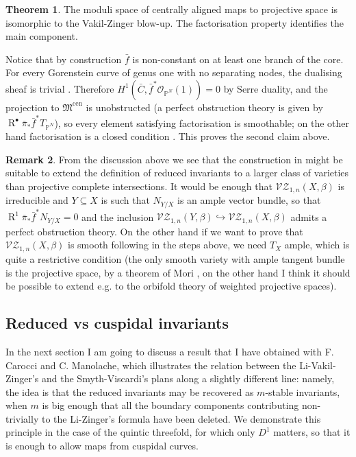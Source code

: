 \documentclass[11pt]{amsart}
\newcommand{\VZ}[3]{\mathcal{V\!Z}_{1,#1}(#2,#3)}
\newcommand{\PP}{\mathbb P}
\newcommand{\OO}{\mathcal{O}}
\newcommand{\MM}{\mathfrak M}
\newcommand{\R}{\operatorname{R}^{\bullet}}
\theoremstyle{definition}
\newtheorem{thm}{Theorem}[section]
\theoremstyle{definition}
\newtheorem{rmk}[thm]{Remark}
\begin{document}
\begin{thm}\cite[Theorems 4.6.3.2 and 4.5.1]{RSPW}
 The moduli space of centrally aligned maps to projective space is isomorphic to the Vakil-Zinger blow-up. The factorisation property identifies the main component.
\end{thm}
Notice that by construction $\bar{f}$ is non-constant on at least one branch of the core. For every Gorenstein curve of genus one with no separating nodes, the dualising sheaf is trivial \cite[Lemma 3.3]{SMY1}. Therefore $H^1(\bar{C},\bar{f}^*\OO_{\PP^N}(1))=0$ by Serre duality, and the projection to $\MM^{\mathrm{cen}}$ is unobstructed (a perfect obstruction theory is given by $\R\bar{\pi}_*\bar{f}^*T_{\PP^N}$), so every element satisfying factorisation is smoothable; on the other hand factorisation is a closed condition \cite[Theorem 4.3]{RSPW}. This proves the second claim above.

\begin{rmk}
 From the discussion above we see that the construction in \cite{RSPW} might be suitable to extend the definition of reduced invariants to a larger class of varieties than projective complete intersections. It would be enough that $\VZ{n}{X}{\beta}$ is irreducible and $Y\subseteq X$ is such that $N_{Y/X}$ is an ample vector bundle, so that $\operatorname R^1\bar{\pi}_*\bar{f}^*N_{Y/X}=0$ and the inclusion $\VZ{n}{Y}{\beta}\hookrightarrow\VZ{n}{X}{\beta}$ admits a perfect obstruction theory. On the other hand if we want to prove that $\VZ{n}{X}{\beta}$ is smooth following in the steps above, we need $T_X$ ample, which is quite a restrictive condition (the only smooth variety with ample tangent bundle is the projective space, by a theorem of Mori \cite{Mori}, on the other hand I think it should be possible to extend e.g. to the orbifold theory of weighted projective spaces).
\end{rmk}
\subsection{Reduced vs cuspidal invariants} In the next section I am going to discuss a result that I have obtained with F. Carocci and C. Manolache, which illustrates the relation between the Li-Vakil-Zinger's and the Smyth-Viscardi's plans along a slightly different line: namely, the idea is that the reduced invariants may be recovered as $m$-stable invariants, when $m$ is big enough that all the boundary components contributing non-trivially to the Li-Zinger's formula have been deleted. We demonstrate this principle in the case of the quintic threefold, for which only $D^1$ matters, so that it is enough to allow maps from cuspidal curves.
\end{document}
